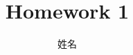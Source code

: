 \documentclass[onecolumn,oneside]{SUSTechHomework}
\author{姓名}
\title{Homework 1}
\begin{document}
  \maketitle

  \blindtext

  \blinddocument
\end{document}
